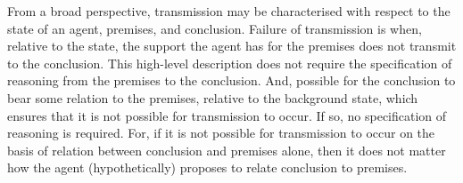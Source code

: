 \documentclass[10pt]{article}
\begin{document}
\begin{note}
  From a broad perspective, transmission may be characterised with respect to the state of an agent, premises, and conclusion.
  Failure of transmission is when, relative to the state, the support the agent has for the premises does not transmit to the conclusion.
  This high-level description does not require the specification of reasoning from the premises to the conclusion.
  And, possible for the conclusion to bear some relation to the premises, relative to the background state, which ensures that it is not possible for transmission to occur.
  If so, no specification of reasoning is required.
  For, if it is not possible for transmission to occur on the basis of relation between conclusion and premises alone, then it does not matter how the agent (hypothetically) proposes to relate conclusion to premises.


\end{note}
\end{document}
